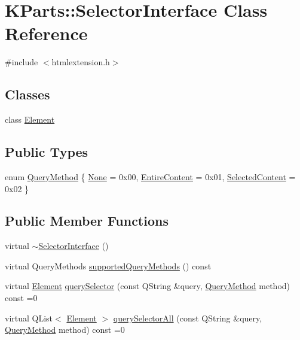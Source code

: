 \hypertarget{classKParts_1_1SelectorInterface}{\section{\-K\-Parts\-:\-:\-Selector\-Interface \-Class \-Reference}
\label{classKParts_1_1SelectorInterface}
}


{\ttfamily \#include $<$htmlextension.\-h$>$}

\subsection*{\-Classes}
\begin{DoxyCompactItemize}
\item 
class \hyperlink{classKParts_1_1SelectorInterface_1_1Element}{\-Element}
\end{DoxyCompactItemize}
\subsection*{\-Public \-Types}
\begin{DoxyCompactItemize}
\item 
enum \hyperlink{classKParts_1_1SelectorInterface_a90fe11660661a423709a52c91a969dce}{\-Query\-Method} \{ \hyperlink{classKParts_1_1SelectorInterface_a90fe11660661a423709a52c91a969dcea75dbd3a4d444c3a5f3ec94c2c20c2322}{\-None} =  0x00, 
\hyperlink{classKParts_1_1SelectorInterface_a90fe11660661a423709a52c91a969dceac39e4ace6e5f56e828ee81b7d1589d4d}{\-Entire\-Content} =  0x01, 
\hyperlink{classKParts_1_1SelectorInterface_a90fe11660661a423709a52c91a969dcea98dd4d0cb11e9068d9c017a6c666ce83}{\-Selected\-Content} =  0x02
 \}
\end{DoxyCompactItemize}
\subsection*{\-Public \-Member \-Functions}
\begin{DoxyCompactItemize}
\item 
virtual \hyperlink{classKParts_1_1SelectorInterface_a01573870d1fdd7143defe395acd359fd}{$\sim$\-Selector\-Interface} ()
\item 
virtual \-Query\-Methods \hyperlink{classKParts_1_1SelectorInterface_a324f1129034129fa347411c70c8c6e39}{supported\-Query\-Methods} () const 
\item 
virtual \hyperlink{classKParts_1_1SelectorInterface_1_1Element}{\-Element} \hyperlink{classKParts_1_1SelectorInterface_a704329531ffbb8abe80c97daaea01b4d}{query\-Selector} (const \-Q\-String \&query, \hyperlink{classKParts_1_1SelectorInterface_a90fe11660661a423709a52c91a969dce}{\-Query\-Method} method) const =0
\item 
virtual \-Q\-List$<$ \hyperlink{classKParts_1_1SelectorInterface_1_1Element}{\-Element} $>$ \hyperlink{classKParts_1_1SelectorInterface_afe199d585952b4aeb1717122753616b3}{query\-Selector\-All} (const \-Q\-String \&query, \hyperlink{classKParts_1_1SelectorInterface_a90fe11660661a423709a52c91a969dce}{\-Query\-Method} method) const =0
\end{DoxyCompactItemize}


